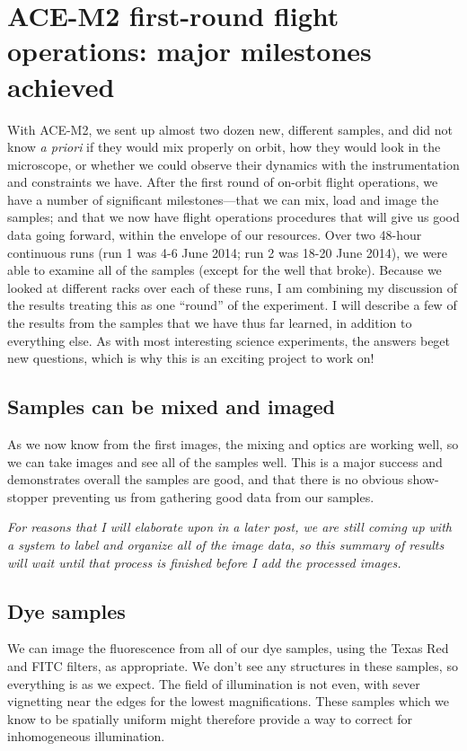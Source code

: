 \section{ACE-M2 first-round flight operations: major milestones achieved}\hypertarget{ace-m2-first-round-flight-operations-major-milestones-achieved}{}\label{ace-m2-first-round-flight-operations-major-milestones-achieved}
With ACE-M2, we sent up almost two dozen new, different samples, and did not
know \emph{a priori} if they would mix properly on orbit, how they would look in
the microscope, or whether we could observe their dynamics with the
instrumentation and constraints we have. After the first round of on-orbit
flight operations, we have a number of significant milestones---that we can mix,
load and image the samples; and that we now have flight operations procedures
that will give us good data going forward, within the envelope of our resources.
Over two 48-hour continuous runs (run 1 was 4-6 June 2014; run 2 was 18-20 June
2014), we were able to examine all of the samples (except for the well that
broke). Because we looked at different racks over each of these runs, I am
combining my discussion of the results treating this as one ``round'' of the
experiment. I will describe a few of the results from the samples that we have
thus far learned, in addition to everything else. As with most interesting
science experiments, the answers beget new questions, which is why this is an
exciting project to work on!

\subsection{Samples can be mixed and
imaged}\hypertarget{samples-can-be-mixed-and-imaged}{}\label{samples-can-be-mixed-and-imaged} As we now know from the first images, the mixing and optics are working well, so we can take
images and see all of the samples well. This is a major success and demonstrates
overall the samples are good, and that there is no obvious show-stopper
preventing us from gathering good data from our samples.

\emph{For reasons that I will elaborate upon in a later post, we are still coming up with a system to label and organize all of the image data, so this summary of results will wait until that process is finished before I add the processed images.}

\subsection{Dye samples}\hypertarget{dye-samples}{}\label{dye-samples}
We can image the fluorescence from all of our dye samples, using the Texas Red
and FITC filters, as appropriate. We don't see any structures in these samples,
so everything is as we expect. The field of illumination is not even, with sever
vignetting near the edges for the lowest magnifications. These samples which we
know to be spatially uniform might therefore provide a way to correct for
inhomogeneous illumination.


